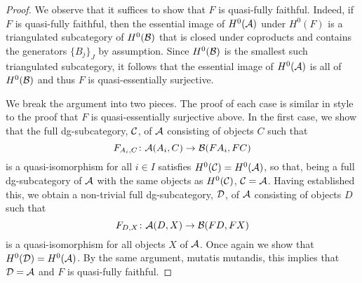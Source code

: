 \begin{proof}
  We observe that it suffices to show that \(F\) is quasi-fully faithful.
  Indeed, if \(F\) is quasi-fully faithful, then the essential image of \(H^0(\mathcal{A})\) under \(H^0(F)\) is a triangulated subcategory of \(H^0(\mathcal{B})\) that is closed under coproducts and contains the generators \(\{B_j\}_J\) by assumption.
  Since \(H^0(\mathcal{B})\) is the smallest such triangulated subcategory, it follows that the essential image of \(H^0(\mathcal{A})\) is all of \(H^0(\mathcal{B})\) and thus \(F\) is quasi-essentially surjective.

  We break the argument into two pieces.
  The proof of each case is similar in style to the proof that \(F\) is quasi-essentially surjective above.
  In the first case, we show that the full dg-subcategory, \(\mathcal{C}\), of \(\mathcal{A}\) consisting of objects \(C\) such that
  \[F_{A_i,C} \colon \mathcal{A}(A_i, C) \to \mathcal{B}(FA_i, FC)\]
  is a quasi-isomorphism for all \(i \in I\) satisfies \(H^0(\mathcal{C}) = H^0(\mathcal{A})\), so that, being a full dg-subcategory of \(\mathcal{A}\) with the same objects as \(H^0(\mathcal{C})\), \(\mathcal{C} = \mathcal{A}\).
  Having established this, we obtain a non-trivial full dg-subcategory, \(\mathcal{D}\), of \(\mathcal{A}\) consisting of objects \(D\) such that
  \[F_{D,X} \colon \mathcal{A}(D,X) \to \mathcal{B}(FD, FX)\]
  is a quasi-isomorphism for all objects \(X\) of \(\mathcal{A}\).
  Once again we show that \(H^0(\mathcal{D}) = H^0(\mathcal{A})\).
  By the same argument, mutatis mutandis, this implies that \(\mathcal{D} = \mathcal{A}\) and \(F\) is quasi-fully faithful.


\end{proof}
